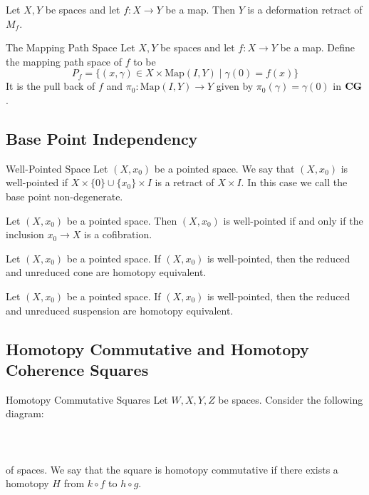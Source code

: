 \documentclass[a4paper]{article}
\begin{document}
\begin{lmm}{}{} Let $X,Y$ be spaces and let $f:X\to Y$ be a map. Then $Y$ is a deformation retract of $M_f$. 
\end{lmm}

\begin{defn}{The Mapping Path Space}{} Let $X,Y$ be spaces and let $f:X\to Y$ be a map. Define the mapping path space of $f$ to be $$P_f=\{(x,\gamma)\in X\times\text{Map}(I,Y)\;|\;\gamma(0)=f(x)\}$$ It is the pull back of $f$ and $\pi_0:\text{Map}(I,Y)\to Y$ given by $\pi_0(\gamma)=\gamma(0)$ in $\bold{CG}$. 
\end{defn}

\subsection{Base Point Independency}
\begin{defn}{Well-Pointed Space}{} Let $(X,x_0)$ be a pointed space. We say that $(X,x_0)$ is well-pointed if $X\times\{0\}\cup\{x_0\}\times I$ is a retract of $X\times I$. In this case we call the base point non-degenerate. 
\end{defn}

\begin{prp}{}{} Let $(X,x_0)$ be a pointed space. Then $(X,x_0)$ is well-pointed if and only if the inclusion $x_0\to X$ is a cofibration. 
\end{prp}

\begin{prp}{}{} Let $(X,x_0)$ be a pointed space. If $(X,x_0)$ is well-pointed, then the reduced and unreduced cone are homotopy equivalent. 
\end{prp}

\begin{prp}{}{} Let $(X,x_0)$ be a pointed space. If $(X,x_0)$ is well-pointed, then the reduced and unreduced suspension are homotopy equivalent. 
\end{prp}

\subsection{Homotopy Commutative and Homotopy Coherence Squares}
\begin{defn}{Homotopy Commutative Squares}{} Let $W,X,Y,Z$ be spaces. Consider the following diagram: \\~\\
\\~\\
of spaces. We say that the square is homotopy commutative if there exists a homotopy $H$ from $k\circ f$ to $h\circ g$. 
\end{defn}
\end{document}
